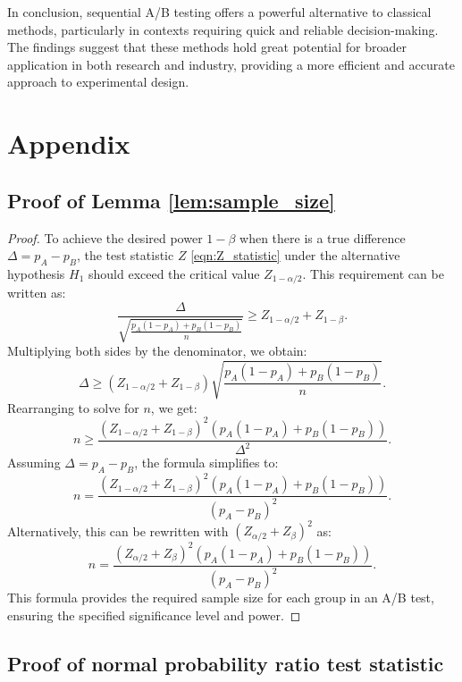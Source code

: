 \documentclass[magisterska, english]{pwr_wmat_praca_dyplomowa}
\theoremstyle{plain}
\numberwithin{theorem}{chapter}
\theoremstyle{definition}
\numberwithin{theorem}{chapter}
\begin{document}
In conclusion, sequential A/B testing offers a powerful alternative to classical methods, particularly in contexts requiring quick and reliable decision-making. The findings suggest that these methods hold great potential for broader application in both research and industry, providing a more efficient and accurate approach to experimental design.


\backmatter \chapter{Appendix} \label{Appendix}
\setcounter{chapter}{1}
\setcounter{section}{0}
\renewcommand{\thesection}{\Alph{chapter}.\arabic{section}}
\section{Proof of Lemma \ref{lem:sample_size}}\label{proof:sample_size}
\begin{proof}	
	To achieve the desired power \( 1-\beta \) when there is a true difference \( \Delta = p_A - p_B \), the test statistic \( Z \) \eqref{eqn:Z_statistic} under the alternative hypothesis \( H_1 \) should exceed the critical value \( Z_{1-\alpha/2} \). This requirement can be written as:
	\[
	\frac{\Delta}{\sqrt{\frac{p_A(1 - p_A) + p_B(1 - p_B)}{n}}} \geq Z_{1-\alpha/2} + Z_{1-\beta}.
	\]
	Multiplying both sides by the denominator, we obtain:
	\[
	\Delta \geq \left(Z_{1-\alpha/2} + Z_{1-\beta}\right) \sqrt{\frac{p_A(1 - p_A) + p_B(1 - p_B)}{n}}.
	\]
	Rearranging to solve for \( n \), we get:
	\[
	n \geq \frac{(Z_{1-\alpha/2} + Z_{1-\beta})^2 \left(p_A(1 - p_A) + p_B(1 - p_B)\right)}{\Delta^2}.
	\]
	Assuming \( \Delta = p_A - p_B \), the formula simplifies to:
	\[
	n = \frac{(Z_{1-\alpha/2} + Z_{1-\beta})^2 \left(p_A(1 - p_A) + p_B(1 - p_B)\right)}{(p_A - p_B)^2}.
	\]
	Alternatively, this can be rewritten with \( (Z_{\alpha/2} + Z_{\beta})^2 \) as:
	\[
	n = \frac{(Z_{\alpha/2} + Z_{\beta})^2 \left(p_A(1 - p_A) + p_B(1 - p_B)\right)}{(p_A - p_B)^2}.
	\]
	This formula provides the required sample size for each group in an A/B test, ensuring the specified significance level and power.
\end{proof}
\newpage
\section{Proof of normal probability ratio test statistic}\label{proof:normal_prts}
\end{document}
